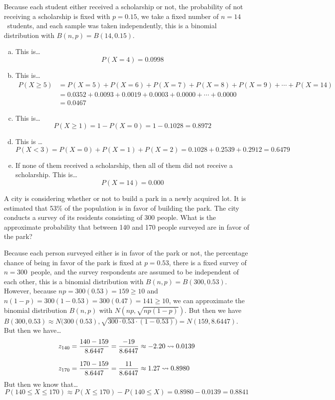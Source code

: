 \documentclass[11pt,letterpaper]{article}
\begin{document}
\sol Because each student either received a scholarship or not, the probability of not receiving a scholarship is fixed with $p= 0.15$, we take a fixed number of $n= 14$~students, and each sample was taken independently, this is a binomial distribution with $B(n, p)= B(14, 0.15)$. 

\begin{enumerate}[(a)]
\item This is\dots
	\[
	P(X= 4)= 0.0998
	\] \pspace
	
\item This is\dots
	\[
	\begin{aligned}
	P(X \geq 5)&= P(X= 5) + P(X= 6) + P(X= 7) + P(X= 8) + P(X= 9) + \cdots + P(X= 14) \\
	&= 0.0352 + 0.0093 + 0.0019 + 0.0003 + 0.0000 + \cdots + 0.0000 \\
	&= 0.0467
	\end{aligned}
	\] \pspace

\item This is\dots
	\[
	P(X \geq 1)= 1 - P(X= 0)= 1 - 0.1028= 0.8972
	\] \pspace

\item This is \dots
	\[
	P(X < 3)= P(X= 0) + P(X= 1) + P(X= 2)= 0.1028 + 0.2539 + 0.2912= 0.6479
	\] \pspace

\item If none of them received a scholarship, then all of them did not receive a scholarship. This is\dots
	\[
	P(X= 14)= 0.000
	\]
\end{enumerate}



\newpage



 A city is considering whether or not to build a park in a newly acquired lot. It is estimated that 53\% of the population is in favor of building the park. The city conducts a survey of its residents consisting of 300 people. What is the approximate probability that between 140 and 170 people surveyed are in favor of the park? \pspace

\sol Because each person surveyed either is in favor of the park or not, the percentage chance of being in favor of the park is fixed at $p= 0.53$, there is a fixed survey of $n= 300$~people, and the survey respondents are assumed to be independent of each other, this is a binomial distribution with $B(n, p)= B(300, 0.53)$. However, because $np= 300(0.53)= 159 \geq 10$ and $n(1 - p)= 300(1 - 0.53)= 300(0.47)= 141 \geq 10$, we can approximate the binomial distribution $B(n, p)$ with $N(np, \sqrt{np(1 - p)})$. But then we have $B(300, 0.53) \approx N \big( 300(0.53), \sqrt{300 \cdot 0.53 \cdot (1 - 0.53)} \big)= N(159, 8.6447)$. But then we have\dots
	\[
	\begin{aligned}
	z_{140}&= \dfrac{140 - 159}{8.6447}= \dfrac{-19}{8.6447} \approx -2.20 \rightsquigarrow 0.0139 \\[0.3cm]
	z_{170}&= \dfrac{170 - 159}{8.6447}= \dfrac{11}{8.6447} \approx 1.27 \rightsquigarrow 0.8980
	\end{aligned}
	\]
But then we know that\dots
	\[
	P(140 \leq X \leq 170) \approx P(X \leq 170) - P(140 \leq X)= 0.8980 - 0.0139= 0.8841
	\]
\end{document}
